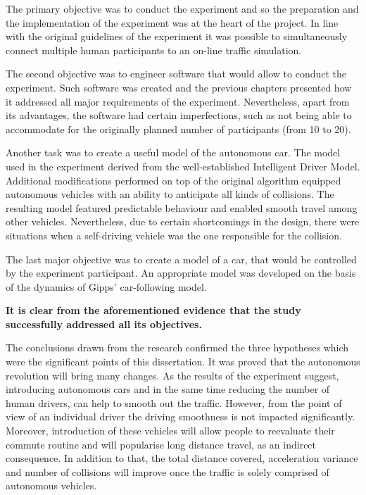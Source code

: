 \documentclass[11pt,english,twoside]{article}
\begin{document}
The primary objective was to conduct the experiment and so the preparation and the implementation of the experiment was at the heart of the project. In line with the original guidelines of the experiment it was possible to simultaneously connect multiple human
participants to an on-line traffic simulation.

The second objective was to engineer software that would allow to conduct the experiment. Such software was created and the previous chapters presented how it addressed all major requirements of the experiment. Nevertheless, apart from its advantages, the software had certain imperfections, such as not being able to accommodate for the originally planned number of participants (from 10 to 20).

Another task was to create a useful model of the autonomous car. The model used in the experiment derived from the well-established Intelligent Driver Model. Additional modifications performed on top of the original algorithm equipped autonomous vehicles with an ability to anticipate all kinds of collisions. The resulting model featured predictable behaviour and enabled smooth travel among other vehicles. Nevertheless, due to certain shortcomings in the design, there were situations when a self-driving vehicle was the one responsible for the collision.

The last major objective was to create a model of a car, that would be controlled by the
experiment participant. An appropriate model was developed on the basis of the dynamics
of Gipps’ car-following model.


\textbf{It is clear from the aforementioned evidence that the study successfully addressed all its objectives.} 

\par

The conclusions drawn from the research confirmed the three hypotheses which were the significant  points of this dissertation. It was proved that the autonomous revolution will bring many changes. As the results of the experiment suggest, introducing autonomous cars and in the same time reducing the number of human drivers, can help to smooth out the traffic. However, from the point of view of an individual driver the driving smoothness is not impacted significantly. Moreover, introduction of these vehicles will allow people to reevaluate their commute routine and will popularise long distance travel, as an indirect consequence. In addition to that, the total distance covered, acceleration variance and number of collisions will improve once the traffic is solely comprised of autonomous vehicles. 
\end{document}
